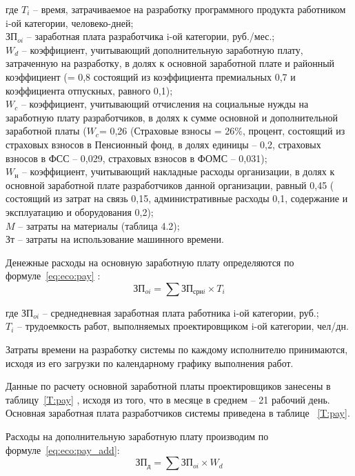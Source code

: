 \documentclass[utf8,usehyperref,12pt]{G7-32}
\begin{document}
где $T_{i}$ -- время, затрачиваемое на разработку программного продукта работником i-ой категории, человеко-дней;\\
$ЗП_{oi}$ -- заработная плата разработчика i-ой категории, руб./мес.;\\
$W_d$ -- коэффициент, учитывающий дополнительную заработную плату, затраченную на разработку, в долях к основной заработной плате и районный коэффициент (= 0,8 состоящий из коэффициента премиальных 0,7 и коэффициента отпускных, равного 0,1);\\
$W_c$ -- коэффициент, учитывающий отчисления на социальные нужды на заработную плату разработчиков, в долях к сумме основной и дополнительной заработной платы ($W_c$= 0,26 (Страховые взносы = 26\%, процент, состоящий из страховых взносов в Пенсионный фонд, в долях единицы – 0,2, страховых взносов в ФСС – 0,029, страховых взносов в ФОМС – 0,031);\\
$W_н$ -- коэффициент, учитывающий накладные расходы организации, в долях к основной заработной плате разработчиков данной организации, равный 0,45 ( состоящий из затрат на связь 0,15, административные расходы 0,1, содержание и эксплуатацию и оборудования 0,2);\\
$M$ – затраты на материалы (таблица 4.2);\\
$Зт$ – затраты на использование машинного времени.

Денежные расходы на основную заработную плату определяются по формуле~\ref{eq:eco:pay} :
\begin{equation}
  \label{eq:eco:pay}
   ЗП_{oi} = \sum ЗП_{срнi} \times T_i
\end{equation}

где $ЗП_{oi}$ – среднедневная заработная плата работника i-ой категории, руб.;\\
 $T_i$ – трудоемкость работ, выполняемых проектировщиком i-ой категории, чел/дн.

Затраты времени на разработку системы по каждому исполнителю принимаются, исходя из его загрузки по календарному графику выполнения работ.

Данные по расчету основной заработной платы проектировщиков занесены в таблицу~\ref{T:pay} , исходя из того, что в месяце в среднем – 21 рабочий день. Основная заработная плата разработчиков системы приведена в таблице ~\ref{T:pay}.

Расходы на дополнительную заработную плату производим по формуле~\ref{eq:eco:pay_add}:
\begin{equation}
  \label{eq:eco:pay_add}
   ЗП_{д} = \sum ЗП_{oi} \times W_d
\end{equation}
\end{document}
